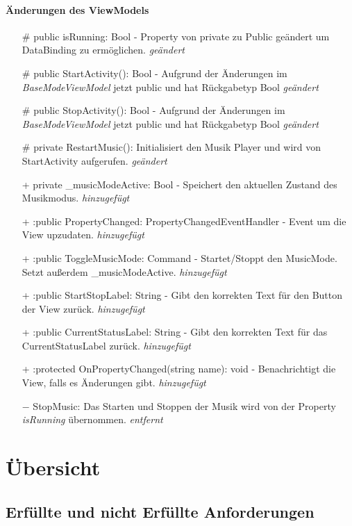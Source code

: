 \documentclass[a4paper,12pt]{article}
\begin{document}
\paragraph{Änderungen des ViewModels}
\begin{itemize}
	\item[\#]public isRunning: Bool - Property von private zu Public geändert um DataBinding zu ermöglichen. \textit{geändert}
	\item[\#]public StartActivity(): Bool - Aufgrund der Änderungen im \textit{BaseModeViewModel} jetzt public und hat Rückgabetyp Bool \textit{geändert}
	\item[\#]public StopActivity(): Bool - Aufgrund der Änderungen im \textit{BaseModeViewModel} jetzt public und hat Rückgabetyp Bool \textit{geändert}
	\item[\#]private RestartMusic(): Initialisiert den Musik Player und wird von StartActivity aufgerufen. \textit{geändert}
	\item[+]private \_musicModeActive: Bool - Speichert den aktuellen Zustand des Musikmodus. \textit{hinzugefügt}
	\item[+]:public PropertyChanged: PropertyChangedEventHandler - Event um die View upzudaten. \textit{hinzugefügt}
	\item[+]:public ToggleMusicMode: Command - Startet/Stoppt den MusicMode. Setzt außerdem \_musicModeActive. \textit{hinzugefügt}
	\item[+]:public StartStopLabel: String - Gibt den korrekten Text für den Button der View zurück. \textit{hinzugefügt}
	\item[+]:public CurrentStatusLabel: String - Gibt den korrekten Text für das CurrentStatusLabel zurück. \textit{hinzugefügt}
	\item[+]:protected OnPropertyChanged(string name): void - Benachrichtigt die View, falls es Änderungen gibt. \textit{hinzugefügt}
	\item[$-$]StopMusic: Das Starten und Stoppen der Musik wird von der Property \textit{isRunning} übernommen. \textit{entfernt}
\end{itemize}


\section{Übersicht}
\subsection{Erfüllte und nicht Erfüllte Anforderungen}
\end{document}
